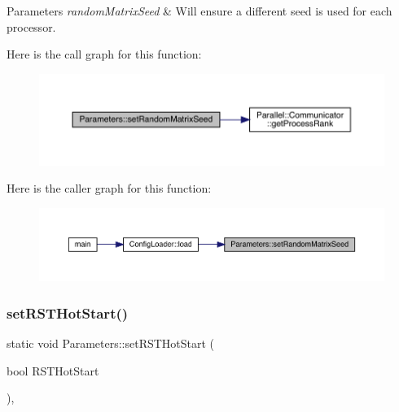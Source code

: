 \begin{DoxyParams}{Parameters}
{\em random\+Matrix\+Seed} & Will ensure a different seed is used for each processor. \\
\hline
\end{DoxyParams}
Here is the call graph for this function\+:
\nopagebreak
\begin{figure}[H]
\begin{center}
\leavevmode
\includegraphics[width=350pt]{class_parameters_a46615f8286bd7363ab1f09074fdc6940_cgraph}
\end{center}
\end{figure}
Here is the caller graph for this function\+:
\nopagebreak
\begin{figure}[H]
\begin{center}
\leavevmode
\includegraphics[width=350pt]{class_parameters_a46615f8286bd7363ab1f09074fdc6940_icgraph}
\end{center}
\end{figure}
\mbox{\label{class_parameters_a84d9a6f8a32bbe13f7abe045453700a0}} 
\subsubsection{\texorpdfstring{setRSTHotStart()}{setRSTHotStart()}}
{\footnotesize\ttfamily static void Parameters\+::set\+R\+S\+T\+Hot\+Start (\begin{DoxyParamCaption}\item[{bool}]{R\+S\+T\+Hot\+Start }\end{DoxyParamCaption})\hspace{0.3cm}{\ttfamily [inline]}, {\ttfamily [static]}}

